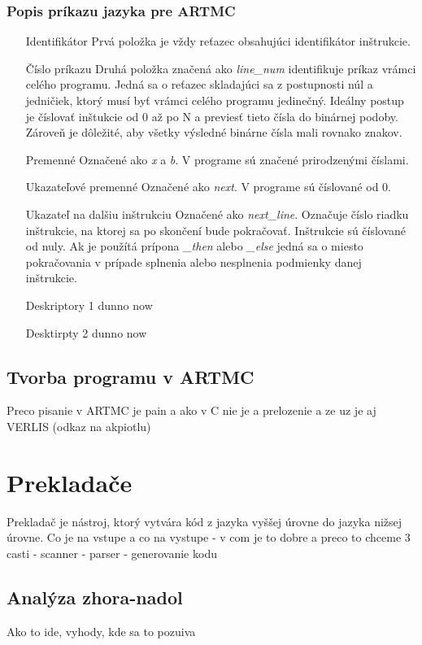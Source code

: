  \subsection{Popis príkazu jazyka pre ARTMC}
 \begin{itemize}
     \item[Identifikátor] Prvá položka je vždy reťazec obsahujúci identifikátor inštrukcie.
     \item[Číslo príkazu] Druhá položka značená ako \textit{line\_num} identifikuje príkaz
         vrámci celého programu. Jedná sa o reťazec skladajúci sa z postupnosti
         núl a jedničiek, ktorý musí byť vrámci celého  programu jedinečný.
         Ideálny postup je číslovať inštukcie od 0 až po N a previesť tieto
         čísla do binárnej podoby. Zároveň je dôležité, aby všetky výsledné binárne čísla mali rovnako znakov.
     \item[Premenné] Označené ako \textit{x} a \textit{b}. V programe sú značené prirodzenými číslami.
     \item[Ukazateľové premenné] Označené ako \textit{next}. V programe sú číslované od 0.
     \item[Ukazateľ na dalšiu inštrukciu] Označené ako \textit{next\_line}. Označuje
         číslo riadku inštrukcie, na ktorej sa po skončení bude pokračovať. Inštrukcie
         sú číslované od nuly. Ak je použítá prípona \textit{\_then} alebo \textit{\_else}
         jedná sa o miesto pokračovania v prípade splnenia alebo nesplnenia podmienky danej inštrukcie.
     \item[Deskriptory 1] dunno now
     \item[Desktirpty 2] dunno now
 \end{itemize}
\section{Tvorba programu v ARTMC}

Preco pisanie v ARTMC je pain a ako v C nie je a prelozenie a ze uz je aj VERLIS (odkaz na akpiotlu)

\chapter{Prekladače}
Prekladač je nástroj, ktorý vytvára kód z jazyka vyššej úrovne do jazyka nižsej úrovne.
Co je na vstupe a co na vystupe - v com je to dobre a preco to chceme
3 casti - scanner - parser - generovanie kodu

\section{Analýza zhora-nadol}
Ako to ide, vyhody, kde sa to pozuiva

